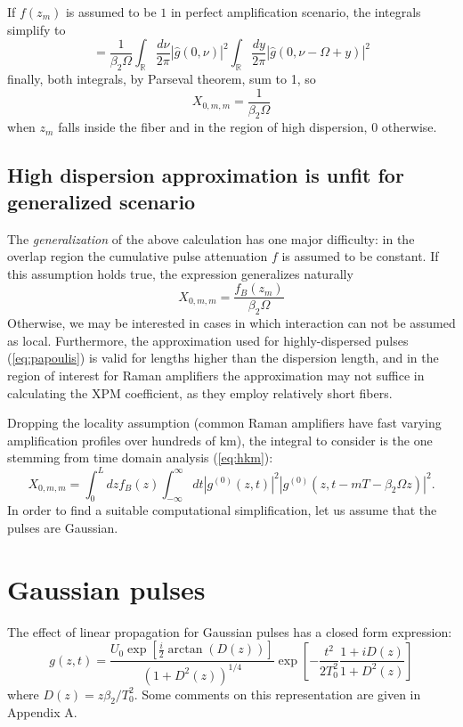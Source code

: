 \documentclass[10pt, lettersize, journal, onecolumn]{IEEEtran}
\begin{document}
If $f(z_m)$ is assumed to be $1$ in perfect amplification scenario, the integrals simplify to
\begin{equation}
	=\frac{1}{ \beta_2 \Omega}\int_{\mathbb{R}} \frac{d\nu}{2\pi}  |\hat{g}(0, \nu)|^2 \int_{\mathbb{R}}  \frac{dy}{2\pi} \left|\hat{g}\left(0, \nu-\Omega + y\right)\right|^2
\end{equation}
finally, both integrals, by Parseval theorem, sum to 1, so 
\begin{equation}
	X_{0, m, m} = \frac{1}{\beta_2 \Omega}  
\end{equation}
when $z_m$ falls inside the fiber and in the region of high dispersion, $0$ otherwise.

	\subsection{High dispersion approximation is unfit for generalized scenario}
The \textit{generalization} of the above calculation has one major difficulty: in the overlap region the cumulative pulse attenuation $f$ is assumed to be constant.
If this assumption holds true, the expression generalizes naturally
\begin{equation}
	X_{0, m, m} = \frac{f_B(z_m)}{\beta_2 \Omega}	
\end{equation}
Otherwise, we may be interested in cases in which interaction can not be assumed as local. 
Furthermore, the approximation used for highly-dispersed pulses (\ref{eq:papoulis}) is valid for lengths higher than the dispersion length, and in the region of interest for Raman amplifiers the approximation may not suffice in calculating the XPM coefficient, as they employ relatively short fibers.

Dropping the locality assumption (common Raman amplifiers have fast varying amplification profiles over hundreds of km), the integral to consider is the one stemming from time domain analysis (\ref{eq:hkm}):
\begin{equation}\label{eq:0mm}
	X_{0, m, m} = \int_{0}^{L} dz f_B(z) \int_{-\infty}^{\infty} dt |g^{(0)}(z, t)|^2 |g^{(0)}(z, t-mT-\beta_2 \Omega z)|^2.
\end{equation}
In order to find a suitable computational simplification, let us assume that the pulses are Gaussian.
\section{Gaussian pulses} \label{gauss}
The effect of linear propagation for Gaussian pulses has a closed form expression:
\begin{equation}\label{eq:field}
	g(z, t) = \frac{U_0 \exp[\frac{i}{2} \arctan(D(z))]}{(1+D^2(z))^{1/4}} \exp\left[-\frac{t^2}{2T_0^2} \frac{1+iD(z)}{1+D^2(z)}\right]
\end{equation}
where $D(z) = z\beta_2 / T_0^2$. Some comments on this representation are given in Appendix A.
\end{document}
